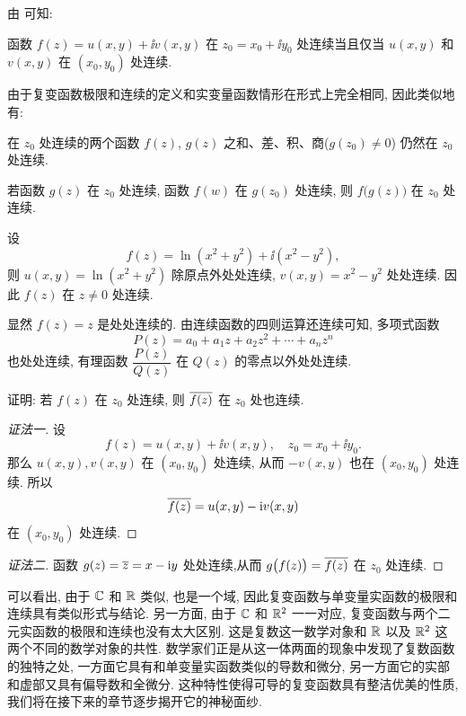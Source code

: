 由 可知:
\begin{theorem}
  函数 $f(z)=u(x,y)+\ii v(x,y)$ 在 $z_0=x_0+\ii y_0$ 处连续当且仅当 $u(x,y)$ 和 $v(x,y)$ 在 $(x_0,y_0)$ 处连续.
\end{theorem}

由于复变函数极限和连续的定义和实变量函数情形在形式上完全相同, 因此类似地有:
\begin{theorem}
  \begin{enuma}
    \item 在 $z_0$ 处连续的两个函数 $f(z)$, $g(z)$ 之和、差、积、商($g(z_0)\neq 0$) 仍然在 $z_0$ 处连续.
    \item 若函数 $g(z)$ 在 $z_0$ 处连续, 函数 $f(w)$ 在 $g(z_0)$ 处连续, 则 $f\bigl(g(z)\bigr)$ 在 $z_0$ 处连续.
  \end{enuma}
\end{theorem}

\begin{exampleenum}
  \item 设
  \[
    f(z)=\ln(x^2+y^2)+\ii(x^2-y^2),
  \]
  则 $u(x,y)=\ln(x^2+y^2)$ 除原点外处处连续, $v(x,y)=x^2-y^2$ 处处连续. 因此 $f(z)$ 在 $z\neq0$ 处连续.
  \item 显然 $f(z)=z$ 是处处连续的.
  由连续函数的四则运算还连续可知, 多项式函数
  \[
    P(z)=a_0+a_1z+a_2z^2+\cdots+a_nz^n
  \]
  也处处连续, 有理函数 $\dfrac{P(z)}{Q(z)}$ 在 $Q(z)$ 的零点以外处处连续.
\end{exampleenum}

\begin{example}
  证明: 若 $f(z)$ 在 $z_0$ 处连续, 则 $\overline{f(z)}$ 在 $z_0$ 处也连续.
\end{example}

\begin{proof}[证法一]
  设
  \[
    f(z)=u(x,y)+\ii v(x,y),\quad
    z_0=x_0+\ii y_0.
  \]
  那么 $u(x,y),v(x,y)$ 在 $(x_0,y_0)$ 处连续, 从而 $-v(x,y)$ 也在 $(x_0,y_0)$ 处连续.
  所以
  \[
    \overline{f(z)}=u(x,y)-\mathrm{i} v(x,y)
  \]
  在 $(x_0,y_0)$ 处连续.
\end{proof}

\begin{proof}[证法二]
  函数 $g(z)=\overline z=x-\mathrm{i} y$ 处处连续,从而 $g\bigl(f(z)\bigr)=\overline{f(z)}$ 在 $z_0$ 处连续.
\end{proof}

可以看出, 由于 ${\mathbb{C}}$ 和 ${\mathbb{R}}$ 类似, 也是一个域, 因此复变函数与单变量实函数的极限和连续具有类似形式与结论.
另一方面, 由于 ${\mathbb{C}}$ 和 ${\mathbb{R}}^2$ 一一对应, 复变函数与两个二元实函数的极限和连续也没有太大区别.
这是复数这一数学对象和 ${\mathbb{R}}$ 以及 ${\mathbb{R}}^2$ 这两个不同的数学对象的共性.
数学家们正是从这一体两面的现象中发现了复数函数的独特之处, 一方面它具有和单变量实函数类似的导数和微分, 另一方面它的实部和虚部又具有偏导数和全微分.
这种特性使得可导的复变函数具有整洁优美的性质, 我们将在接下来的章节逐步揭开它的神秘面纱.


